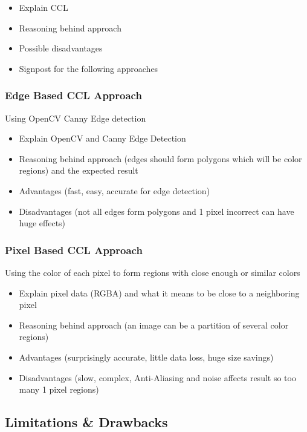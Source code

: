 \documentclass[14pt]{article}
\begin{document}
    \begin{itemize}
        \item Explain CCL
        \item Reasoning behind approach
        \item Possible disadvantages
        \item Signpost for the following approaches
    \end{itemize}

    \subsubsection{Edge Based CCL Approach}

    Using OpenCV Canny Edge detection

    \begin{itemize}
        \item Explain OpenCV and Canny Edge Detection
        \item Reasoning behind approach (edges should form polygons which will be color regions) and the expected result
        \item Advantages (fast, easy, accurate for edge detection)
        \item Disadvantages (not all edges form polygons and 1 pixel incorrect can have huge effects)
    \end{itemize}

    \subsubsection{Pixel Based CCL Approach}

    Using the color of each pixel to form regions with close enough or similar colors

    \begin{itemize}
        \item Explain pixel data (RGBA) and what it means to be close to a neighboring pixel
        \item Reasoning behind approach (an image can be a partition of several color regions)
        \item Advantages (surprisingly accurate, little data loss, huge size savings)
        \item Disadvantages (slow, complex, Anti-Aliasing and noise affects result so too many 1 pixel regions)
    \end{itemize}

    \subsection{Limitations \& Drawbacks}
\end{document}
